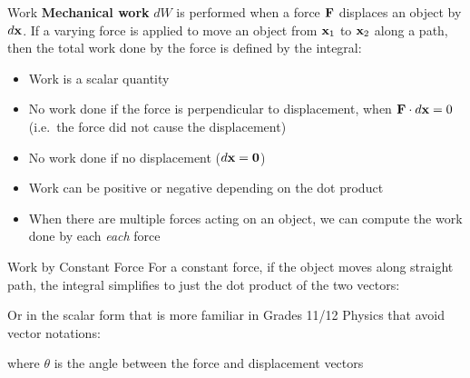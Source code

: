\documentclass[12pt,compress,aspectratio=169]{beamer}
\newcommand{\mb}[1]{\ensuremath\mathbf{#1}}
\newcommand{\eq}[2]{\vspace{#1}{\Large\begin{displaymath}#2\end{displaymath}}}
\begin{document}
\begin{frame}{Work}
  \textbf{Mechanical work} $dW$ is performed when a force $\mb{F}$ displaces an
  object by $d\mb{x}$. If a varying force
  is applied to move an object from $\mb{x}_1$ to $\mb{x}_2$ along a path, then
  the total work done by the force is defined by the integral:

  \eq{-.2in}{
    W=\int\mb{F}(\mb{x})\cdot d\mb{x}
  }

  \begin{itemize}
  \item Work is a scalar quantity
  \item No work done if the force is perpendicular to displacement, when
    $\mb{F}\cdot d\mb{x}=0$ (i.e.\ the force did not cause the displacement)
  \item No work done if no displacement ($d\mb{x}=\mb{0}$)
  \item Work can be positive or negative depending on the dot product
  \item When there are multiple forces acting on an object, we can compute the
    work done by each \emph{each} force
  \end{itemize}
\end{frame}



\begin{frame}{Work by Constant Force}
  For a constant force, if the object moves along straight path, the integral
  simplifies to just the dot product of the two vectors:

  \eq{-.2in}{
    \boxed{
      W=\mb{F}\cdot\Delta\mb{r}
    }
  }

  Or in the scalar form that is more familiar in Grades 11/12 Physics that
  avoid vector notations:

  \eq{-.2in}{
    \boxed{W=F\Delta x\cos\theta}
  }

  \vspace{-.1in}where $\theta$ is the angle between the force and displacement
  vectors
\end{frame}
\end{document}
